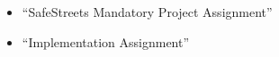 \clearpage
{}
\label{sect:installation}


\clearpage
{}
\label{sect:effort}



\clearpage
{}


\begin{itemize}
        \item
        “SafeStreets Mandatory Project Assignment”
        \item
        “Implementation Assignment”
\end{itemize}


